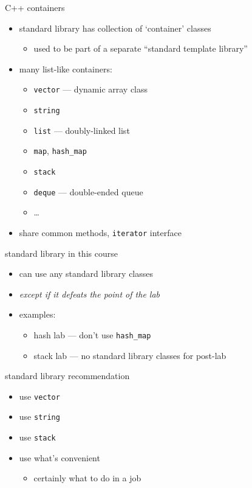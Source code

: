 \begin{frame}{C++ containers}
    \begin{itemize}
    \item standard library has collection of `container' classes
        \begin{itemize}
        \item used to be part of a separate ``standard template library''
        \end{itemize}
    \item many list-like containers:
        \begin{itemize}
        \item \texttt{vector} --- dynamic array class
        \item \texttt{string}
        \item \texttt{list} --- doubly-linked list
        \item \texttt{map}, \texttt{hash\_map}
        \item \texttt{stack}
        \item \texttt{deque} --- double-ended queue
        \item \ldots
        \end{itemize}
    \item share common methods, \texttt{iterator} interface
    \end{itemize}
\end{frame}

\begin{frame}{standard library in this course}
    \begin{itemize}
    \item can use any standard library classes
    \item \textit{except if it defeats the point of the lab}
    \item examples:
        \begin{itemize}
        \item hash lab --- don't use \texttt{hash\_map}
        \item stack lab --- no standard library classes for post-lab
        \end{itemize}
    \end{itemize}
\end{frame}

\begin{frame}{standard library recommendation}
    \begin{itemize}
        \item use \texttt{vector}
        \item use \texttt{string}
        \item use \texttt{stack}
        \item use what's convenient
            \begin{itemize}
            \item certainly what to do in a job
            \end{itemize}
    \end{itemize}
\end{frame}

